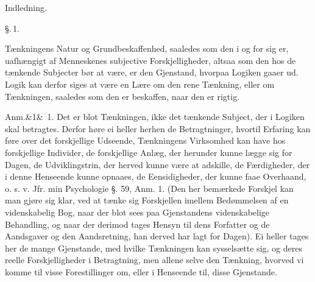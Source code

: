 \documentclass[12pt]{book}
\def\sperr#1{#1}%
\def\textit#1{#1}%
\newcommand{\sperr}[1]{\textls[180]{#1}}
\newcommand{\gruppe}[1]{%
  \par\vspace{0.9\baselineskip}%
  \begin{center}{#1\par}\end{center}
  \vspace{0.4\baselineskip}
  \phantomsection
  \addcontentsline{toc}{section}{#1}%
}
\newcommand{\parag}[1]{%
  \par\vspace{0.9\baselineskip}%
  {\centering\textit{\S.\,#1.}\par}%
  \vspace{0.35\baselineskip}%
  \noindent\hspace{\parindent}\ignorespaces
}
\newcommand{\anm}[1]{%
  \par\vspace{0.5\baselineskip}%
  \noindent\hspace{\parindent}\sperr{Anm.}\ifx&#1&\else~\textit{#1}.\fi
  \enspace\ignorespaces
}
\newcommand{\opage}[1]{\marginnote{\footnotesize\textit{[#1]}}}
\begin{document}
\gruppe{Indledning.}
\opage{1} %
\parag{1}
Tænkningens Natur og Grundbeskaffenhed, saaledes som den i og for sig er,
uafhængigt af Menneskenes subjective Forskjelligheder, altsaa som den hos de
tænkende Subjecter bør at være, er den Gjenstand, hvorpaa Logiken gaaer ud.
Logik kan derfor siges at være en Lære om den rene Tænkning, eller om
Tænkningen, saaledes som den er beskaffen, naar den er rigtig.

\anm{1} Det er blot Tænkningen, ikke det tænkende Subject, der i Logiken skal
betragtes. Derfor høre ei heller herhen de Betragtninger, hvortil Erfaring kan
føre over det forskjellige Udseende, Tænkningens Virksomhed kan have hos
forskjellige Individer, de forskjellige Anlæg, der herunder kunne lægge sig for
Dagen, de Udviklingstrin, der herved kunne være at adskille, de Færdigheder,
der i denne Henseende kunne opnaaes, de Eensidigheder, der kunne faae
Overhaand, o. s. v. Jfr. min Psychologie §. 59, Anm. 1. (Den her bemærkede
Forskjel kan man gjøre sig klar, ved at tænke sig Forskjellen imellem
Bedømmelsen af en videnskabelig Bog, naar der blot sees paa Gjenstandens
\opage{2} videnskabelige Behandling, og naar der derimod tages Hensyn til dens Forfatter
og de Aandsgaver og den Aandsretning, han derved har lagt for Dagen). Ei heller
tages her de mange Gjenstande, med hvilke Tænkningen kan sysselsætte sig, og
deres reelle Forskjelligheder i Betragtning, men allene selve den Tænkning,
hvorved vi komme til visse Forestillinger om, eller i Henseende til, disse
Gjenstande.
\end{document}
